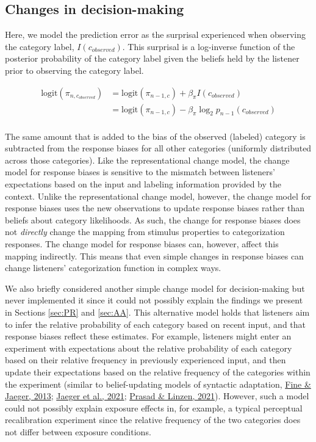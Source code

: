\documentclass[
  11pt,
  english,
  man,floatsintext]{apa6}
\begin{document}
\hypertarget{sec:SI-models-changes-in-decision-making}{%
\subsection{Changes in decision-making}\label{sec:SI-models-changes-in-decision-making}}

Here, we model the prediction error as the surprisal experienced when observing the category label, \(I(c_{observed})\). This surprisal is a log-inverse function of the posterior probability of the category label given the beliefs held by the listener prior to observing the category label.

\begin{equation}\label{eq:bias-updating}
\begin{split}
\mathrm{logit}(\pi_{n,c_{observed}}) & = \mathrm{logit}(\pi_{n-1,c}) + \beta_{\pi} I(c_{observed}) \\
                          & = \mathrm{logit}(\pi_{n-1,c}) - \beta_{\pi} \log_2 p_{n-1}(c_{observed}) \\
\end{split}
\end{equation}

The same amount that is added to the bias of the observed (labeled) category is subtracted from the response biases for all other categories (uniformly distributed across those categories).
Like the representational change model, the change model for response biases is sensitive to the mismatch between listeners' expectations based on the input and labeling information provided by the context. Unlike the representational change model, however, the change model for response biases uses the new observations to update response biases rather than beliefs about category likelihoods. As such, the change for response biases does not \emph{directly} change the mapping from stimulus properties to categorization responses. The change model for response biases can, however, affect this mapping indirectly. This means that even simple changes in response biases can change listeners' categorization function in complex ways.

We also briefly considered another simple change model for decision-making but never implemented it since it could not possibly explain the findings we present in Sections \ref{sec:PR} and \ref{sec:AA}. This alternative model holds that listeners aim to infer the relative probability of each category based on recent input, and that response biases reflect these estimates. For example, listeners might enter an experiment with expectations about the relative probability of each category based on their relative frequency in previously experienced input, and then update their expectations based on the relative frequency of the categories within the experiment (similar to belief-updating models of syntactic adaptation, \protect\hyperlink{ref-fine-jaeger2013}{Fine \& Jaeger, 2013}; \protect\hyperlink{ref-jaeger2019}{Jaeger et al., 2021}; \protect\hyperlink{ref-prasad2021}{Prasad \& Linzen, 2021}). However, such a model could not possibly explain exposure effects in, for example, a typical perceptual recalibration experiment since the relative frequency of the two categories does not differ between exposure conditions.
\end{document}
